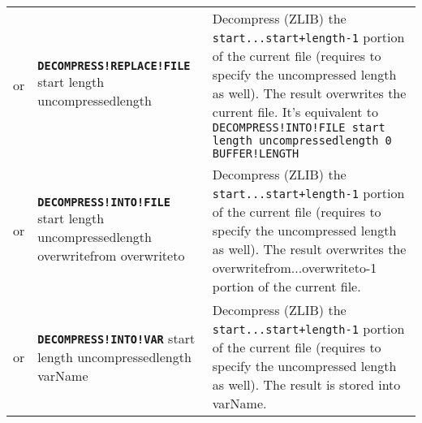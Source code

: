 \documentclass{article}
\def\DEFINE#1{{\tt \bf #1}\label{#1}\index{#1}}
\begin{document}
\begin{tabular}{cp{10in}|p{10in}}
or & \DEFINE{DECOMPRESS!REPLACE!FILE} start length uncompressedlength &
	Decompress (ZLIB) the \verb/start...start+length-1/ portion of the current
	file (requires to specify the uncompressed length as well). The result overwrites
	the current file. It's equivalent to
	\verb+DECOMPRESS!INTO!FILE start length uncompressedlength 0 BUFFER!LENGTH+
\\
or & \DEFINE{DECOMPRESS!INTO!FILE} start length uncompressedlength overwritefrom
  overwriteto &
	Decompress (ZLIB) the \verb/start...start+length-1/ portion of the current
	file (requires to specify the uncompressed length as well). The result overwrites
	the overwritefrom...overwriteto-1 portion of the current file.
\\
or & \DEFINE{DECOMPRESS!INTO!VAR} start length uncompressedlength varName &
	Decompress (ZLIB) the \verb/start...start+length-1/ portion of the current
	file (requires to specify the uncompressed length as well). The result is stored
	into varName.
\\


\end{tabular}
\end{document}
